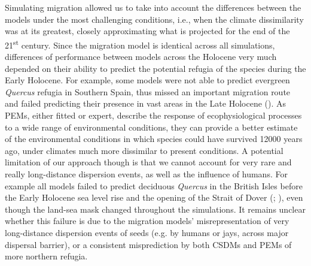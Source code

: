 \begin{figure}[ht!]
\label{fig:pastperformance}
\vspace*{1cm}
\end{figure}

Simulating migration allowed us to take into account the differences between the models under the most challenging conditions, i.e., when the climate dissimilarity was at its greatest, closely approximating what is projected for  the end of the 21\textsuperscript{st} century. Since the migration model is identical across all simulations, differences of performance between models across the Holocene very much depended on their ability to predict the potential refugia of the species during the Early Holocene. For example, some models were not able to predict evergreen \emph{Quercus} refugia in Southern Spain, thus missed an important migration route and failed predicting their presence in vast areas in the Late Holocene (). As PEMs, either fitted or expert, describe the response of ecophysiological processes to a wide range of environmental conditions, they can provide a better estimate of the environmental conditions in which species could have survived 12000 years ago, under climates much more dissimilar to present conditions. A potential limitation of our approach though is that we cannot account for very rare and really long-distance dispersion events, as well as the influence of humans. For example all models failed to predict deciduous \emph{Quercus} in the British Isles before the Early Holocene sea level rise and the opening of the Strait of Dover (; \citealp{Smith2011}), even though the land-sea mask changed throughout the simulations. It remains unclear whether this failure is due to the migration models' misrepresentation of very long-distance dispersion events of seeds (e.g. by humans or jays, across major dispersal barrier), or a consistent misprediction by both CSDMs and PEMs of more northern refugia.

